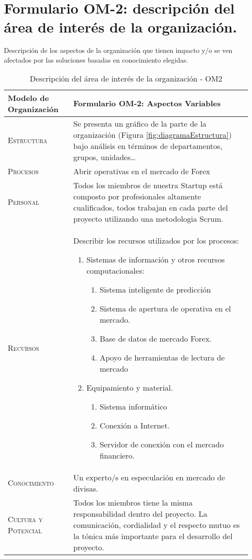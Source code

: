  
\section{Formulario OM-2: descripción del área de interés de la organización.}

Descripción de los aspectos de la organización que tienen impacto y/o se ven afectados
  por las soluciones basadas en conocimiento elegidas.


\begin{table}[H]
\scriptsize
\begin{tabularx}{\textwidth}{|l|X|} \hline
\textbf{Modelo de Organización} & \textbf{Formulario OM-2: Aspectos Variables} \\ \hline\hline

\textsc{Estructura} & Se presenta un gráfico de la parte de la organización (Figura \ref{fig:diagramaEstructura}) bajo análisis en términos de departamentos, grupos, unidades\dots\\ \hline

\textsc{Procesos} & Abrir operativas en el mercado de Forex\\ \hline
\textsc{Personal} &  Todos los miembros de nuestra Startup está composto por profesionales altamente cualificados, todos trabajan en cada parte del proyecto utilizando una metodologia Scrum.\\ \hline
\textsc{Recursos} &  Describir los recursos utilizados por los procesos:
\begin{enumerate}
    \item Sistemas de información y otros recursos computacionales:
    \begin{enumerate}
      \item Sistema inteligente de predicción
      \item Sistema de apertura de operativa en el mercado.
      \item Base de datos de mercado Forex.
      \item Apoyo de herramientas de lectura de mercado
    \end{enumerate}
    \item Equipamiento y material.
    \begin{enumerate}
      \item Sistema informático
      \item Conexión a Internet.
      \item Servidor de conexión con el mercado financiero.
    \end{enumerate}
\end{enumerate}
\\ \hline
\textsc{Conocimiento} &  Un experto/s en especulación en mercado de divisas.\\ \hline
\textsc{Cultura y Potencial} &  Todos los miembros tiene la misma responsabilidad dentro del proyecto. La comunicación, cordialidad y el respecto mutuo es la tónica más importante para el desarrollo del proyecto.\\ \hline
\end{tabularx}
  \caption{\label{tab:OM2}Descripción del área de interés de la organización - OM2}
\end{table}

